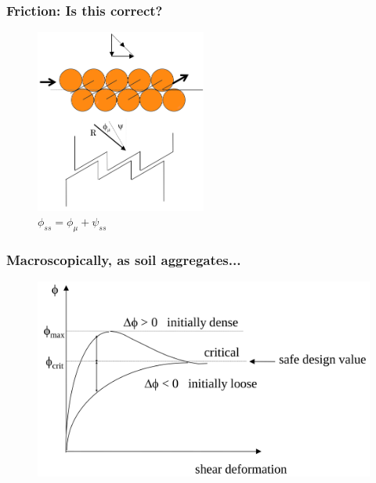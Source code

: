 \documentclass[notes]{beamer}
\begin{document}
\begin{frame}
	\frametitle{Friction: Is this correct?}
	\begin{figure}
		\includegraphics[width=0.5\textwidth]{figs/friction-sawblade.png}
		\caption*{$\phi_{ss} = \phi_\mu + \psi_{ss}$}
	\end{figure}
\end{frame}


\begin{frame}
	\frametitle{Macroscopically, as soil aggregates...}
	\begin{figure}
		\includegraphics[width=\textwidth]{figs/macroscopic-friction.png}
	\end{figure}
\end{frame}
\end{document}
